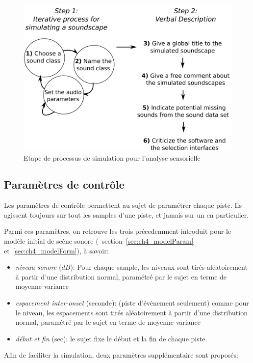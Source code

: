 \begin{figure}[bth]
        \myfloatalign
        \includegraphics[width=.8\linewidth]{gfx/4}
       \caption{Etape de processus de simulation pour l'analyse sensorielle}\label{fig:etapeSimu}
\end{figure}

\subsection{Paramètres de contrôle}
\label{sec:ch4_param}

Les paramètres de contrôle  permettent au sujet de paramétrer chaque piste. Ils agissent toujours sur tout les samples d'une piste, et jamais sur un en particulier.

Parmi ces paramètres, on retrouve les trois précedemment introduit pour le modèle initial de scène sonore (\cf~section~\ref{sec:ch4_modelParam} et~\ref{sec:ch4_modelForm}), à savoir:

\begin{itemize}
\item \emph{niveau sonore} ($dB$): Pour chaque sample, les niveaux sont tirés aléatoirement à partir d'une distribution normal, paramétré par le sujet en terme de moyenne variance
\item \emph{espacement inter-onset} (seconde): (piste d'événement seulement) comme pour le niveau, les espacements sont tirés aléatoirement à partir d'une distribution normal, paramétré par le sujet en terme de moyenne variance
\item \emph{début et fin} (sec): le sujet fixe le début et la fin de chaque piste.
\end{itemize}

Afin de faciliter la simulation, deux paramètres supplémentaire sont proposés:

